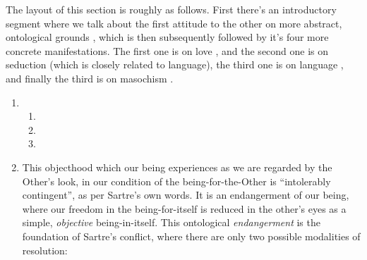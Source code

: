 The layout of this section is roughly as follows. First there's an introductory segment where we talk about the first attitude to the other on more abstract, ontological grounds \autocite[482 -- 485]{sartre}, which is then subsequently followed by it's four more concrete manifestations. The first one is on love \autocite[485 -- 493]{sartre}, and the second one is on seduction \autocite[492 -- 493]{sartre} (which is closely related to language), the third one is on language \autocite[493 -- 499]{sartre}, and finally the third is on masochism \autocite[499 -- 501]{sartre}.

\begin{enumerate}
  \item {}
  \begin{enumerate}
    \item {}
    \item {}
    \item {}
  \end{enumerate}
  \item This objecthood which our being experiences as we are regarded by the Other's look, in our condition of the being-for-the-Other is \enquote{intolerably contingent}, as per Sartre's own words. It is an endangerment of our being, where our freedom in the being-for-itself is reduced in the other's eyes as a simple, \emph{objective} being-in-itself. This ontological \emph{endangerment} is the foundation of Sartre's conflict, where there are only two possible modalities of resolution:

\end{enumerate}
